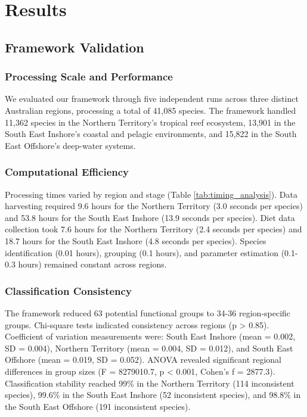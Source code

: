 \section{Results}

\subsection{Framework Validation}

\subsubsection{Processing Scale and Performance}
We evaluated our framework through five independent runs across three distinct Australian regions, processing a total of 41,085 species. The framework handled 11,362 species in the Northern Territory's tropical reef ecosystem, 13,901 in the South East Inshore's coastal and pelagic environments, and 15,822 in the South East Offshore's deep-water systems. 

\subsubsection{Computational Efficiency}



Processing times varied by region and stage (Table \ref{tab:timing_analysis}). Data harvesting required 9.6 hours for the Northern Territory (3.0 seconds per species) and 53.8 hours for the South East Inshore (13.9 seconds per species). Diet data collection took 7.6 hours for the Northern Territory (2.4 seconds per species) and 18.7 hours for the South East Inshore (4.8 seconds per species). Species identification (0.01 hours), grouping (0.1 hours), and parameter estimation (0.1-0.3 hours) remained constant across regions.

\subsubsection{Classification Consistency}
The framework reduced 63 potential functional groups to 34-36 region-specific groups. Chi-square tests indicated consistency across regions (p > 0.85). Coefficient of variation measurements were: South East Inshore (mean = 0.002, SD = 0.004), Northern Territory (mean = 0.004, SD = 0.012), and South East Offshore (mean = 0.019, SD = 0.052). ANOVA revealed significant regional differences in group sizes (F = 8279010.7, p < 0.001, Cohen's f = 2877.3). Classification stability reached 99\% in the Northern Territory (114 inconsistent species), 99.6\% in the South East Inshore (52 inconsistent species), and 98.8\% in the South East Offshore (191 inconsistent species).

